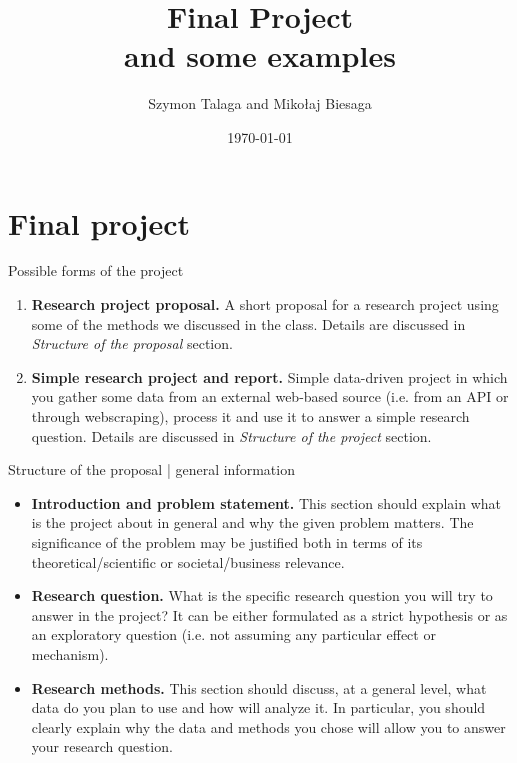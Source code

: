 \title[Final Project]{
 Final Project \\
 \small{and some examples}
}
\author[]{Szymon Talaga and Mikołaj Biesaga} %
\date{\today} %

\frame{\titlepage}

\section{Final project}

\begin{frame}{Possible forms of the project}
\begin{enumerate}
 \item \textbf{Research project proposal.}
 A short proposal for a research project using some of the methods we discussed in the class. Details are discussed
 in \textit{Structure of the proposal} section.
 \item \textbf{Simple research project and report.}
 Simple data-driven project in which you gather some data from an external web-based source (i.e. from an API or through webscraping), process it and use it to answer a simple research question. Details are discussed in
 \textit{Structure of the project} section.
\end{enumerate}
\end{frame}

\begin{frame}{Structure of the proposal | general information}
\begin{itemize}
 \item \textbf{Introduction and problem statement.}
 This section should explain what is the project about in general and why the given problem matters. The significance of the problem may be justified both in terms of its theoretical/scientific or societal/business relevance.
 \item \textbf{Research question.}
 What is the specific research question you will try to answer in the project? It can be either formulated as a strict hypothesis or as an exploratory question (i.e. not assuming any particular effect or mechanism).
 \item \textbf{Research methods.}
 This section should discuss, at a general level, what data do you plan to use and how will analyze it. In particular, you should clearly explain why the data and methods you chose will allow you to answer your research question.
\end{itemize}
\end{frame}

